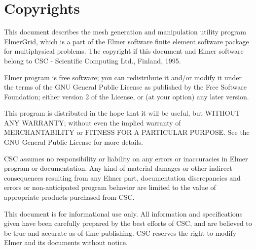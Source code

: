 \chapter*{Copyrights}

This document describes the mesh generation and manipulation utility 
program ElmerGrid, which is a part of the Elmer software
finite element software package for multiphysical problems.
The copyright if this document and Elmer software belong to
CSC - Scientific Computing Ltd., Finland, 1995. 

Elmer program is free software; you can redistribute it and/or
modify it under the terms of the GNU General Public License
as published by the Free Software Foundation; either version 2
of the License, or (at your option) any later version.

This program is distributed in the hope that it will be useful,
but WITHOUT ANY WARRANTY; without even the implied warranty of
MERCHANTABILITY or FITNESS FOR A PARTICULAR PURPOSE.  See the
GNU General Public License for more details.

CSC assumes no responsibility or liability on any errors or inaccuracies in 
Elmer program or documentation. Any kind of material damages or other indirect
consequences resulting from any Elmer part, documentation discrepancies and 
errors or non-anticipated program behavior are limited to the value of 
appropriate products purchased from CSC. 

This document is for informational use only. All information and specifications
given have been carefully prepared by the best efforts of CSC, and are believed
to be true and accurate as of time publishing. CSC reserves the right to 
modify Elmer and its documents without notice. \\  \mbox{} \\

